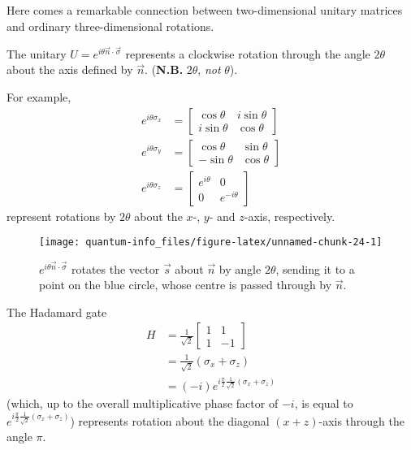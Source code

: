 \documentclass[fleqn]{article}
\newenvironment{idea}{\noindent}{\medskip}
\begin{document}
Here comes a remarkable connection between two-dimensional unitary matrices and ordinary three-dimensional rotations.

\begin{idea}

The unitary \(U = e^{i\theta \vec{n}\cdot\vec{\sigma}}\) represents a clockwise rotation through the angle \(2\theta\) about the axis defined by \(\vec{n}\).
(\textbf{N.B.} \(2\theta\), \emph{not} \(\theta\)).

\end{idea}

For example,
\[
  \begin{aligned}
    e^{i\theta\sigma_x}
    &=
    \begin{bmatrix}
      \cos\theta & i\sin\theta
    \\i\sin\theta & \cos\theta
    \end{bmatrix}
  \\e^{i\theta\sigma_y}
    &=
    \begin{bmatrix}
      \cos\theta & \sin\theta
    \\-\sin\theta & \cos\theta
    \end{bmatrix}
  \\e^{i\theta\sigma_z}
    &= \begin{bmatrix}e^{i\theta}&0\\0&e^{-i\theta}\end{bmatrix}
  \end{aligned}
\]
represent rotations by \(2\theta\) about the \(x\)-, \(y\)- and \(z\)-axis, respectively.



\begin{figure}[H]

{\centering \texttt{[image: quantum-info\_files/figure-latex/unnamed-chunk-24-1]} 

}

\caption{\(e^{i\theta\vec{n}\cdot\vec{\sigma}}\) rotates the vector \(\vec{s}\) about \(\vec{n}\) by angle \(2\theta\), sending it to a point on the blue circle, whose centre is passed through by \(\vec{n}\).}\label{fig:unnamed-chunk-24}
\end{figure}

The Hadamard gate
\[
  \begin{aligned}
    H
    &= \frac{1}{\sqrt 2}
    \begin{bmatrix}
      1& 1
    \\1 & -1
    \end{bmatrix}
  \\&= \frac{1}{\sqrt 2}(\sigma_x + \sigma_z)
  \\&= (-i)e^{i \frac{\pi}{2} \frac{1}{\sqrt 2}(\sigma_x+\sigma_z)}
  \end{aligned}
\]
(which, up to the overall multiplicative phase factor of \(-i\), is equal to \(e^{i \frac{\pi}{2} \frac{1}{\sqrt 2}(\sigma_x+\sigma_z)}\)) represents rotation about the diagonal \((x+z)\)-axis through the angle \(\pi\).
\end{document}
